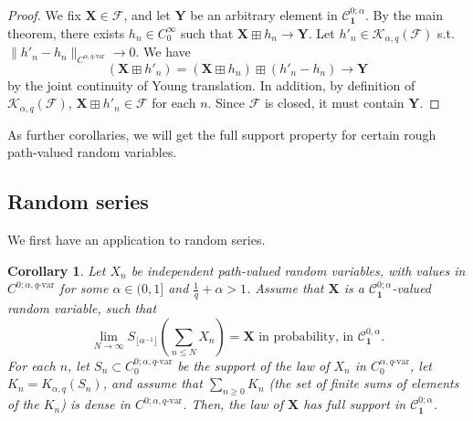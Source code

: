 \documentclass[12pt,a4paper]{article}
\numberwithin{equation}{section}
\def\cK{\mathcal{K}}\def\cC{\mathcal{C}}
\theoremstyle{plain}
\newtheorem{corollary}[theorem]{Corollary}
\theoremstyle{definition}
\theoremstyle{remark}
\begin{document}
\begin{proof}
We fix $\mathbf{X} \in \mathcal{F}$, and let $\mathbf{Y}$ be an arbitrary element in $\mathcal{C}^{0;\alpha}_{\mathbf{1}}$. By the main theorem, there exists $h_n \in C^{\infty}_0$ such that $ \mathbf{X} \boxplus h_n\to  \mathbf{Y}$.  Let $h'_n \in \cK_{\alpha,q}(\mathcal{F})$ s.t. $\|h'_n - h_n \|_{C^{\alpha,q\text{-var}}}  \to 0$. We have
\[
(\mathbf{X}\boxplus h'_n) = (\mathbf{X}\boxplus h_n)\boxplus (h'_n - h_n) \to \mathbf{Y}
\]
by the joint continuity of Young translation. In addition, by definition of $\cK_{\alpha,q}(\mathcal{F})$, $\mathbf{X} \boxplus h'_n\in \mathcal{F}$ for each $n$. Since $\mathcal{F}$ is closed, it must contain $\mathbf{Y}$.

\end{proof}

As further corollaries, we will get the full support property for certain rough path-valued random variables.

\subsection*{Random series}
We first have an application to random series.
\begin{corollary} \label{cor:series}
Let $X_n$ be independent path-valued random variables, with values in $C^{0;\alpha,q\text{-var}}$ for some $\alpha \in (0,1]$ and $\frac{1}{q}+\alpha>1$. Assume that $\mathbf{X}$ is a $\mathcal{C}^{0;\alpha}_{\mathbf{1}}$-valued random variable, such that
 \[
 \lim_{N \to \infty} S_{\lfloor \alpha^{-1} \rfloor}\left( \sum_{n \leq N} X_n \right) = \mathbf{X} \mbox{ in probability, in }\mathcal{C}^{0,\alpha}_{\mathbf{1}}.
 \]
For each $n$, let $S_n \subset C^{0;\alpha,q\text{-var}}_0$ be the support of the law of $X_n$ in $C^{\alpha,q\text{-var}}_0$,  let $K_n =K_{\alpha,q} (S_n)$, and assume that $\sum_{n \geq 0} K_n $ (the set of finite sums of elements of the $K_n$) is dense in $C^{0;\alpha,q\text{-var}}$. Then, the law of $\mathbf{X}$ has full support in $\mathcal{C}^{0;\alpha}_{\mathbf{1}}$.
\end{corollary}
\end{document}
